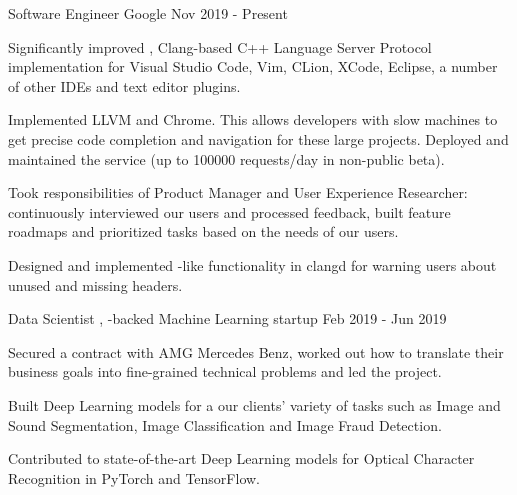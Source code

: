 
\begin{cventries}

  \cventry
    {Software Engineer}
    {Google}
    {}
    {Nov 2019 - Present}
    {
      \begin{cvitems}
        \item Significantly improved ,
          Clang-based C++ Language Server Protocol implementation for Visual
          Studio Code, Vim, CLion, XCode, Eclipse, a number of other IDEs and
          text editor plugins.
        \item Implemented 
          LLVM and Chrome. This allows developers with slow machines to get
          precise code completion and navigation for these large projects.
          Deployed and maintained the service (up to 100000 requests/day in
          non-public beta).
        \item Took responsibilities of Product Manager and User Experience
          Researcher: continuously interviewed our users and processed feedback,
          built feature roadmaps and prioritized tasks based on the needs of our
          users.
        \item Designed and implemented -like
          functionality in clangd for warning users about unused and missing
          headers.
      \end{cvitems}
    }

  \cventry
    {Data Scientist}
    {,
     -backed Machine Learning
     startup}
    {}
    {Feb 2019 - Jun 2019}
    {
      \begin{cvitems}
        \item Secured a contract with AMG Mercedes Benz, worked out how to
          translate their business goals into fine-grained technical problems
          and led the project.
        \item Built Deep Learning models for a our clients' variety of tasks
          such as Image and Sound Segmentation, Image Classification and Image
          Fraud Detection.
        \item Contributed to state-of-the-art Deep Learning models for Optical
          Character Recognition in PyTorch and TensorFlow.
      \end{cvitems}
    }


\end{cventries}
